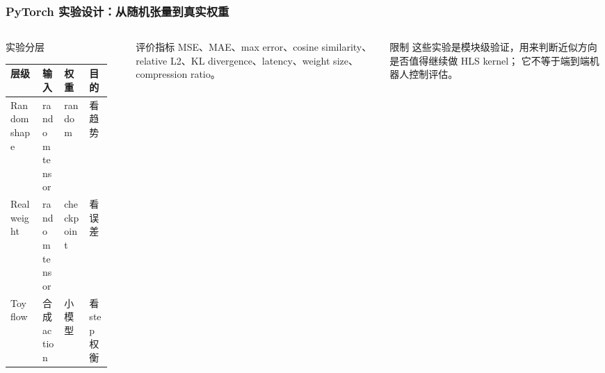 \documentclass[10pt, aspectratio=169]{beamer}
\begin{document}
\begin{frame}
  \frametitle{PyTorch 实验设计：从随机张量到真实权重}
  \small
  \begin{columns}[T,onlytextwidth]
    \begin{block}{实验分层}
      \scriptsize
      \setlength{\tabcolsep}{2pt}
      \begin{tabular}{@{}p{0.28\linewidth}p{0.18\linewidth}p{0.22\linewidth}p{0.20\linewidth}@{}}
        \toprule
        层级           & 输入            & 权重         & 目的        \\
        \midrule
        Random shape & random tensor & random     & 看趋势       \\
        Real weight  & random tensor & checkpoint & 看误差       \\
        Toy flow     & 合成 action     & 小模型        & 看 step 权衡 \\
        \bottomrule
      \end{tabular}
    \end{block}

    \begin{exampleblock}{评价指标}
      MSE、MAE、max error、cosine similarity、relative L2、KL divergence、latency、weight size、compression ratio。
    \end{exampleblock}

    \begin{alertblock}{限制}
      这些实验是模块级验证，用来判断近似方向是否值得继续做 HLS kernel；
      它不等于端到端机器人控制评估。
    \end{alertblock}
  \end{columns}
\end{frame}
\end{document}
